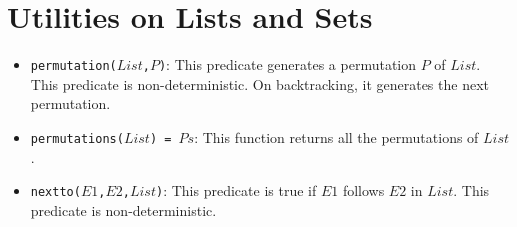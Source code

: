 \section{Utilities on Lists and Sets}
\begin{itemize}
\item \texttt{permutation($List$,$P$)}: This predicate generates a permutation $P$ of $List$. This predicate is non-deterministic. On backtracking, it generates the next permutation.
\item \texttt{permutations($List$) = $Ps$}: This function returns all the permutations of $List$.
\item \texttt{nextto($E1$,$E2$,$List$)}: This predicate is true if \texttt{$E1$} follows \texttt{$E2$} in \texttt{$List$}. This predicate is non-deterministic.
\end{itemize}

\ignore{

}
